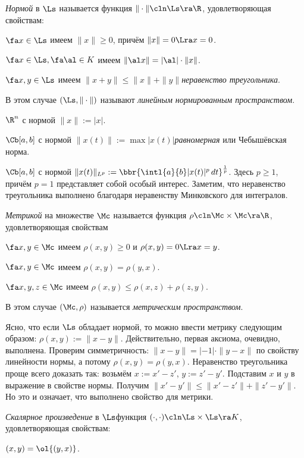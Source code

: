 \documentclass[a4paper]{article}
\newcommand{\intlab}{\intl{a}{b}}
\begin{document}
\emph{Нормой} в $\Ls$ называется функция $\|\cdot\|\cln\Ls\ra \R$, удовлетворяющая свойствам:

 $\fa x \in \Ls$ имеем $\|x\| \ge 0$, причём $\|x\|=0 \Lra x = 0$.

 $\fa x \in \Ls, \fa \al \in K$ имеем $\|\al x\|=|\al|\cdot\|x\|$.

 $\fa x,y\in \Ls$ имеем $\|x+y\| \le \|x\|+\|y\|$\т \emph{неравенство треугольника}.

В этом случае $(\Ls, \|\cdot\|)$ называют \emph{линейным нормированным пространством}.

\begin{ex}
 $\R^n$ с нормой $\|x\|:= |x|$.

 $\Cb[a,b]$ с нормой $\|x(t)\| := \max |x(t)|$\т \emph{равномерная} или Чебышёвская норма.

 $\Cb[a,b]$ с нормой $\|x(t)\|_{L^p} := \bbr{\intlab |x(t)|^p\,d t}^{\frac{1}{p}}$. Здесь $p
\ge 1$, причём $p = 1$ представляет собой особый интерес. Заметим, что неравенство треугольника
выполнено благодаря неравенству Минковского для интегралов.
\end{ex}

\emph{Метрикой} на множестве $\Mc$ называется функция $\rho\cln\Mc \times \Mc \ra \R$, удовлетворяющая свойствам

 $\fa x,y\in \Mc$ имеем $\rho(x,y) \ge 0$ и $\rho(x,y) = 0 \Lra x = y$.

 $\fa x,y \in \Mc$ имеем $\rho(x,y) = \rho(y,x)$.

 $\fa x,y,z \in \Mc$ имеем $\rho(x,y) \le \rho(x,z) + \rho(z,y)$.

В этом случае $(\Mc, \rho)$ называется \emph{метрическим пространством}.

Ясно, что если $\Ls$ обладает нормой, то можно ввести метрику следующим образом:
$\rho(x,y) := \|x - y\|$. Действительно, первая аксиома, очевидно, выполнена. Проверим
симметричность: $\|x-y\|=|-1|\cdot\|y-x\|$ по свойству линейности нормы,
а потому $\rho(x,y) = \rho(y,x)$. Неравенство треугольника проще всего доказать так:
возьмём $x := x' -z'$, $y := z'-y'$. Подставим $x$ и $y$ в выражение в свойстве 
нормы. Получим $\|x'-y'\| \le \|x'-z'\|+\|z'-y'\|$. Но это и означает, что выполнено свойство 
для метрики.

\emph{Скалярное произведение} в $\Ls$\т функция $(\cdot,\cdot)\cln\Ls\times\Ls \ra K$, удовлетворяющая свойствам:

 $(x,y) = \ol{(y,x)}$.
\end{document}
